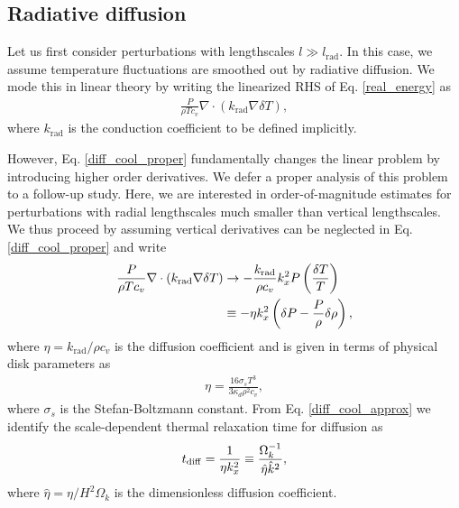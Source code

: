 
\subsection{Radiative diffusion}
Let us first consider perturbations with lengthscales $l\gg
l_\mathrm{rad}$. In this case, we assume  
temperature fluctuations are smoothed out by radiative diffusion. We
mode this in linear theory by writing the linearized RHS of
Eq. \ref{real_energy} as 
\begin{align}\label{diff_cool_proper}
  \frac{P}{\rho T c_v} \nabla\cdot\left(k_\mathrm{rad}\nabla\delta
    T\right),  
\end{align}
where $k_\mathrm{rad}$ is the conduction coefficient to be defined
implicitly.

However, Eq. \ref{diff_cool_proper} fundamentally changes the linear problem by
introducing higher order derivatives. We defer a proper analysis of
this problem to a follow-up study. Here, we are interested in
order-of-magnitude estimates for perturbations with radial
lengthscales much smaller than vertical lengthscales. We thus proceed
by assuming vertical derivatives can be neglected in
Eq. \ref{diff_cool_proper} and write  
\begin{align}\label{diff_cool_approx}
  \frac{P}{\rho T c_v} \nabla\cdot\left(k_\mathrm{rad}\nabla\delta
    T\right) &\to -\frac{k_\mathrm{rad}}{\rho
    c_v}k_x^2P\left(\frac{\delta T}{T}\right)\notag\\
  &\equiv -\eta k_x^2 \left(\delta P - \frac{P}{\rho}\delta\rho\right), 
\end{align}
where $\eta=k_\mathrm{rad}/\rho c_v$ is the diffusion coefficient and
is given in terms of physical disk parameters as 
\begin{align}\label{eta_def}
  \eta = \frac{16\sigma_s T^3}{3\kappa_d\rho^2 c_v}, 
\end{align}
where $\sigma_s$ is the Stefan-Boltzmann constant. 
From Eq. \ref{diff_cool_approx} we identify the scale-dependent thermal relaxation
time for diffusion as 
\begin{align}\label{tc_diff_cool} 
  t_\mathrm{diff} = \frac{1}{\eta k_x^2}\equiv \frac{\Omega_k^{-1}}{\hat{\eta}\hat{k}^2}, 
\end{align}
where $\hat{\eta} = \eta/H^2\Omega_k$ is the 
dimensionless diffusion coefficient. 



